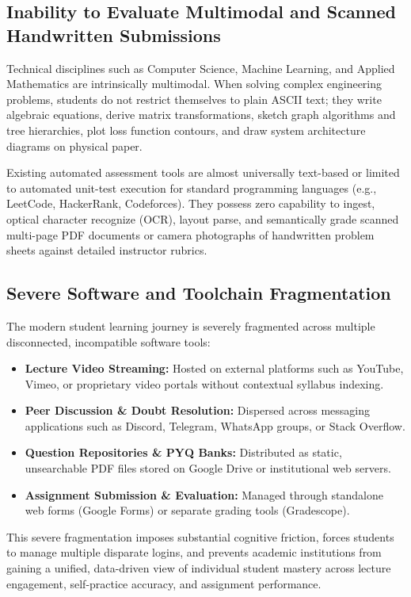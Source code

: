 \subsection{Inability to Evaluate Multimodal and Scanned Handwritten Submissions}
Technical disciplines such as Computer Science, Machine Learning, and Applied Mathematics are intrinsically multimodal. When solving complex engineering problems, students do not restrict themselves to plain ASCII text; they write algebraic equations, derive matrix transformations, sketch graph algorithms and tree hierarchies, plot loss function contours, and draw system architecture diagrams on physical paper.

Existing automated assessment tools are almost universally text-based or limited to automated unit-test execution for standard programming languages (e.g., LeetCode, HackerRank, Codeforces). They possess zero capability to ingest, optical character recognize (OCR), layout parse, and semantically grade scanned multi-page PDF documents or camera photographs of handwritten problem sheets against detailed instructor rubrics.

\subsection{Severe Software and Toolchain Fragmentation}
The modern student learning journey is severely fragmented across multiple disconnected, incompatible software tools:
\begin{itemize}[leftmargin=*]
    \item \textbf{Lecture Video Streaming:} Hosted on external platforms such as YouTube, Vimeo, or proprietary video portals without contextual syllabus indexing.
    \item \textbf{Peer Discussion \& Doubt Resolution:} Dispersed across messaging applications such as Discord, Telegram, WhatsApp groups, or Stack Overflow.
    \item \textbf{Question Repositories \& PYQ Banks:} Distributed as static, unsearchable PDF files stored on Google Drive or institutional web servers.
    \item \textbf{Assignment Submission \& Evaluation:} Managed through standalone web forms (Google Forms) or separate grading tools (Gradescope).
\end{itemize}

This severe fragmentation imposes substantial cognitive friction, forces students to manage multiple disparate logins, and prevents academic institutions from gaining a unified, data-driven view of individual student mastery across lecture engagement, self-practice accuracy, and assignment performance.

